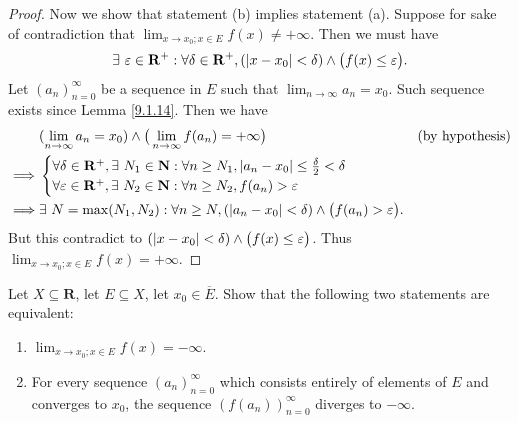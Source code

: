 \begin{proof}
    Now we show that statement (b) implies statement (a).
    Suppose for sake of contradiction that \(\lim_{x \to x_0 ; x \in E} f(x) \neq +\infty\).
    Then we must have
    \[
        \exists\ \varepsilon \in \mathbf{R}^+ : \forall \delta \in \mathbf{R}^+, (\abs*{x - x_0} < \delta) \land \big(f(x) \leq \varepsilon\big).
    \]
    Let \((a_n)_{n = 0}^\infty\) be a sequence in \(E\) such that \(\lim_{n \to \infty} a_n = x_0\).
    Such sequence exists since Lemma \ref{9.1.14}.
    Then we have
    \begin{align*}
                 & (\lim_{n \to \infty} a_n = x_0) \land \big(\lim_{n \to \infty} f(a_n) = +\infty\big)                                                  & \text{(by hypothesis)} \\
        \implies & \begin{cases}
                       \forall \delta \in \mathbf{R}^+, \exists\ N_1 \in \mathbf{N} : \forall n \geq N_1, \abs*{a_n - x_0} \leq \frac{\delta}{2} < \delta \\
                       \forall \varepsilon \in \mathbf{R}^+, \exists\ N_2 \in \mathbf{N} : \forall n \geq N_2, f(a_n) > \varepsilon
                   \end{cases}                             \\
        \implies & \exists\ N = \max(N_1, N_2) : \forall n \geq N, (\abs*{a_n - x_0} < \delta) \land \big(f(a_n) > \varepsilon\big).
    \end{align*}
    But this contradict to \((\abs*{x - x_0} < \delta) \land \big(f(x) \leq \varepsilon\big)\).
    Thus \(\lim_{x \to x_0 ; x \in E} f(x) = +\infty\).
\end{proof}

\begin{additional corollary}\label{ac 9.5.4}
Let \(X \subseteq \mathbf{R}\), let \(E \subseteq X\), let \(x_0 \in \overline{E}\).
Show that the following two statements are equivalent:
\begin{enumerate}
    \item \(\lim_{x \to x_0 ; x \in E} f(x) = -\infty\).
    \item For every sequence \((a_n)_{n = 0}^\infty\) which consists entirely of elements of \(E\) and converges to \(x_0\), the sequence \((f(a_n))_{n = 0}^\infty\) diverges to \(-\infty\).
\end{enumerate}
\end{additional corollary}

